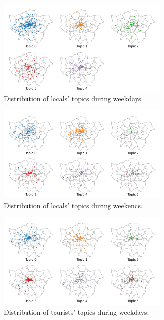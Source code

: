 \documentclass{article}
\theoremstyle{definition}
\theoremstyle{remark}
\begin{document}
\begin{figure}[!h]
\centering
\includegraphics[width=0.75\textwidth]{figures/topics_distribution_weekday_locals.png}
\caption{\label{fig:topics_distribution_weekday_locals}Distribution of locals' topics during weekdays.}
\end{figure}

\begin{figure}[!h]
\centering
\includegraphics[width=0.75\textwidth]{figures/topics_distribution_weekend_locals.png}
\caption{\label{fig:topics_distribution_weekend_locals}Distribution of locals' topics during weekends.}
\end{figure}

\begin{figure}[!h]
\centering
\includegraphics[width=0.75\textwidth]{figures/topics_distribution_weekday_tourists.png}
\caption{\label{fig:topics_distribution_weekday_tourists}Distribution of tourists' topics during weekdays.}
\end{figure}
\end{document}
